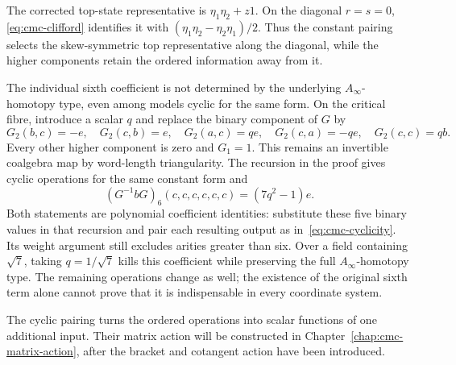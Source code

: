 The corrected top-state representative is
\(\eta_1\eta_2+z1\). On the diagonal \(r=s=0\),
\eqref{eq:cmc-clifford} identifies it with
\((\eta_1\eta_2-\eta_2\eta_1)/2\).
Thus the constant pairing selects the skew-symmetric top
representative along the diagonal, while the higher components
retain the ordered information away from it.

The individual sixth coefficient is not determined by the
underlying \(A_\infty\)-homotopy type, even among models cyclic
for the same form. On the critical fibre, introduce a scalar
\(q\) and replace the binary component of \(G\) by
\[
 G_2(b,c)=-e,\quad G_2(c,b)=e,\quad
 G_2(a,c)=qe,\quad G_2(c,a)=-qe,\quad G_2(c,c)=qb.
\]
Every other higher component is zero and \(G_1=1\).
This remains an invertible coalgebra map by word-length
triangularity. The recursion in the proof gives cyclic
operations for the same constant form and
\[
 (G^{-1}bG)_6(c,c,c,c,c,c)=(7q^2-1)e.
\]
Both statements are polynomial coefficient identities: substitute
these five binary values in that recursion and pair each resulting
output as in~\eqref{eq:cmc-cyclicity}. Its weight argument still
excludes arities greater than six. Over a field containing
\(\sqrt7\), taking \(q=1/\sqrt7\) kills this coefficient while
preserving the full \(A_\infty\)-homotopy type. The remaining operations
change as well; the existence of the original sixth term alone
cannot prove that it is indispensable in every coordinate system.

The cyclic pairing turns the ordered operations into scalar functions of
one additional input. Their matrix action will be constructed in
Chapter~\ref{chap:cmc-matrix-action}, after the bracket and cotangent
action have been introduced.
